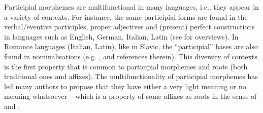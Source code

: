 \documentclass[output=paper,colorlinks,citecolor=brown]{langscibook}
\begin{document}
Participial morphemes are multifunctional in many languages, i.e., they appear in a variety of contexts. For instance, the same participial forms are found in the verbal/eventive participles, proper adjectives and (present) perfect constructions in languages such as English, German, Italian, Latin (see \citealt{Borik2019, Wegner2019book} for overviews). In Romance languages (Italian, Latin), like in Slavic, the ``participial'' bases are also found in nominalisations (e.g. \citealt{Calabrese2020}, and references therein). This diversity of contexts is the first property that is common to participial morphemes and roots (both traditional ones and affixes). The multifunctionality of participial morphemes has led many authors to propose that they have either a very light meaning or no meaning whatsoever -- which is a property of some affixes as roots in the sense of \citet{creemers2018some} and \citet{simonovic2020ov}. 
\end{document}
